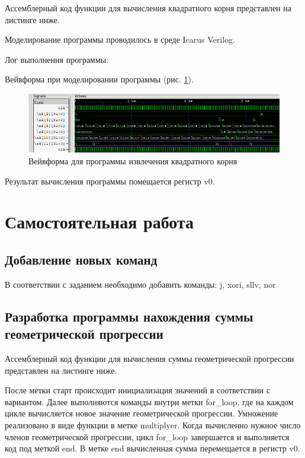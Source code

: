 \documentclass[a4paper,14pt]{article}
\begin{document}
	Ассемблерный код функции для вычисления квадратного корня представлен на листинге ниже.
	
	{\small {}}
	
	Моделирование программы проводилось в среде Icarus Verilog.
	
	Лог выполнения программы:
	
	{\small {}}
	
	Вейвформа при моделировании программы (рис. \ref{fig:02wvf}).
	
	\begin{figure}[H]
		\centering
		\includegraphics[width=0.95\linewidth]{images/02_wvf}
		\caption{Вейвформа для программы извлечения квадратного корня}
		\label{fig:02wvf}
	\end{figure}

	Результат вычисления программы помещается регистр v0.
	
	
	\section{Самостоятельная работа}
	
	\subsection{Добавление новых команд}
	
	В соответствии с заданием необходимо добавить команды: j, xori, sllv, nor
	
	
	\subsection{Разработка программы нахождения суммы геометрической прогрессии}
	
	Ассемблерный код функции для вычисления суммы геометрической прогрессии представлен на листинге ниже.
	
	{\small {}}
	
	После метки старт происходит инициализация значений в соответствии с вариантом.
	Далее выполняются команды внутри метки for\_loop, где на каждом цикле вычисляется новое значение геометрической прогрессии.
	Умножение реализовано в виде функции в метке multiplyer.
	Когда вычисленно нужное число членов геометрической прогрессии, цикл for\_loop завершается и выполняется код под меткой end.
	В метке end вычисленная сумма перемещается в регистр v0.
	
\end{document}
